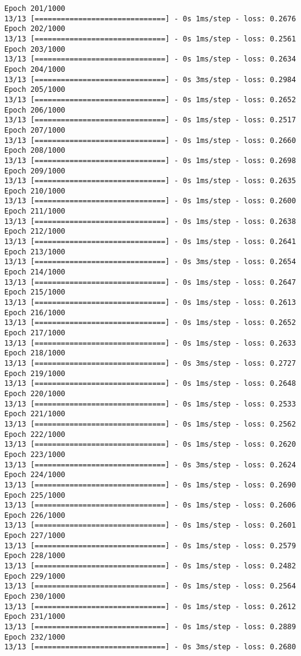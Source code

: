 \documentclass[11pt]{article}
\begin{document}
\begin{Verbatim}[commandchars=\\\{\}]
Epoch 201/1000
13/13 [==============================] - 0s 1ms/step - loss: 0.2676
Epoch 202/1000
13/13 [==============================] - 0s 1ms/step - loss: 0.2561
Epoch 203/1000
13/13 [==============================] - 0s 1ms/step - loss: 0.2634
Epoch 204/1000
13/13 [==============================] - 0s 3ms/step - loss: 0.2984
Epoch 205/1000
13/13 [==============================] - 0s 1ms/step - loss: 0.2652
Epoch 206/1000
13/13 [==============================] - 0s 1ms/step - loss: 0.2517
Epoch 207/1000
13/13 [==============================] - 0s 1ms/step - loss: 0.2660
Epoch 208/1000
13/13 [==============================] - 0s 1ms/step - loss: 0.2698
Epoch 209/1000
13/13 [==============================] - 0s 1ms/step - loss: 0.2635
Epoch 210/1000
13/13 [==============================] - 0s 1ms/step - loss: 0.2600
Epoch 211/1000
13/13 [==============================] - 0s 1ms/step - loss: 0.2638
Epoch 212/1000
13/13 [==============================] - 0s 1ms/step - loss: 0.2641
Epoch 213/1000
13/13 [==============================] - 0s 3ms/step - loss: 0.2654
Epoch 214/1000
13/13 [==============================] - 0s 1ms/step - loss: 0.2647
Epoch 215/1000
13/13 [==============================] - 0s 1ms/step - loss: 0.2613
Epoch 216/1000
13/13 [==============================] - 0s 1ms/step - loss: 0.2652
Epoch 217/1000
13/13 [==============================] - 0s 1ms/step - loss: 0.2633
Epoch 218/1000
13/13 [==============================] - 0s 3ms/step - loss: 0.2727
Epoch 219/1000
13/13 [==============================] - 0s 1ms/step - loss: 0.2648
Epoch 220/1000
13/13 [==============================] - 0s 1ms/step - loss: 0.2533
Epoch 221/1000
13/13 [==============================] - 0s 1ms/step - loss: 0.2562
Epoch 222/1000
13/13 [==============================] - 0s 1ms/step - loss: 0.2620
Epoch 223/1000
13/13 [==============================] - 0s 3ms/step - loss: 0.2624
Epoch 224/1000
13/13 [==============================] - 0s 1ms/step - loss: 0.2690
Epoch 225/1000
13/13 [==============================] - 0s 1ms/step - loss: 0.2606
Epoch 226/1000
13/13 [==============================] - 0s 1ms/step - loss: 0.2601
Epoch 227/1000
13/13 [==============================] - 0s 1ms/step - loss: 0.2579
Epoch 228/1000
13/13 [==============================] - 0s 1ms/step - loss: 0.2482
Epoch 229/1000
13/13 [==============================] - 0s 1ms/step - loss: 0.2564
Epoch 230/1000
13/13 [==============================] - 0s 1ms/step - loss: 0.2612
Epoch 231/1000
13/13 [==============================] - 0s 1ms/step - loss: 0.2889
Epoch 232/1000
13/13 [==============================] - 0s 3ms/step - loss: 0.2680

\end{Verbatim}
\end{document}
